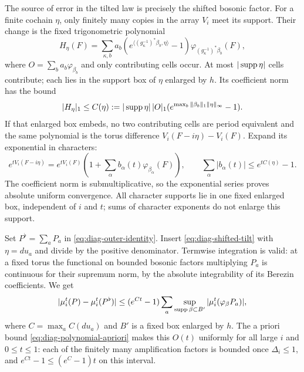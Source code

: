 The source of error in the tilted law is precisely the shifted
bosonic factor. For a finite cochain $\eta$, only finitely
many copies in the array $V_i$ meet its support. Their change
is the fixed trigonometric polynomial
\begin{equation}\label{eq:diag-array-shift}
 H_\eta(F)=\sum_{\kappa,b}a_b
       (e^{\langle(g_\kappa^{-1})^*\beta_b,\eta\rangle}-1)
                        \varphi_{(g_\kappa^{-1})^*\beta_b}(F),
\end{equation}
where $O=\sum_ba_b\varphi_{\beta_b}$ and only contributing
cells occur. At most $|\operatorname{supp}\eta|$ cells contribute; each
lies in the support box of $\eta$ enlarged by $h$. Its
coefficient norm has the bound
\begin{equation}\label{eq:diag-array-shift-size}
 |H_\eta|_1\le C(\eta):=|\operatorname{supp}\eta|\,|O|_1
        (e^{\max_b\|\beta_b\|_1\|\eta\|_\infty}-1).
\end{equation}
If that enlarged box embeds, no two contributing cells are
period equivalent and the same polynomial is the torus
difference $V_i(F-i\eta)-V_i(F)$. Expand its exponential
in characters:
\begin{equation}\label{eq:diag-shifted-tilt}
 e^{tV_i(F-i\eta)}=e^{tV_i(F)}
        \left(1+\sum_\alpha b_\alpha(t)\varphi_{\beta_\alpha}(F)\right),
 \qquad\sum_\alpha|b_\alpha(t)|\le e^{tC(\eta)}-1.
\end{equation}
The coefficient norm is submultiplicative, so the exponential
series proves absolute uniform convergence. All character
supports lie in one fixed enlarged box, independent of $i$
and $t$; sums of character exponents do not enlarge this support.

Set $P^\flat=\sum_aP_a$ in \eqref{eq:diag-outer-identity}.
Insert \eqref{eq:diag-shifted-tilt} with $\eta=du_a$ and divide
by the positive denominator. Termwise integration is valid:
at a fixed torus the functional on bounded bosonic factors
multiplying $P_a$ is continuous for their supremum norm, by
the absolute integrability of its Berezin coefficients.
We get
\begin{equation}\label{eq:diag-outer-error}
 |\mu_i^t(P)-\mu_i^t(P^\flat)|
 \le(e^{Ct}-1)\sum_a
       \sup_{\operatorname{supp}\beta\subset B'}|\mu_i^t(\varphi_\beta P_a)|,
\end{equation}
where $C=\max_aC(du_a)$ and $B'$ is a fixed box enlarged
by $h$. The a priori bound
\eqref{eq:diag-polynomial-apriori} makes this $O(t)$ uniformly
for all large $i$ and $0\le t\le1$: each of the finitely many
amplification factors is bounded once $\Delta_i\le1$, and
$e^{Ct}-1\le(e^C-1)t$ on this interval.

